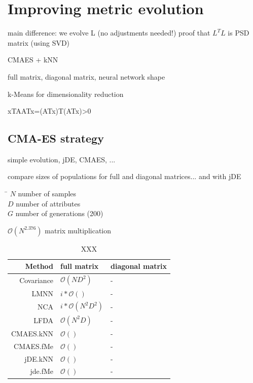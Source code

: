 \documentclass[12pt,a4paper]{report}
\begin{document}



\chapter{Improving metric evolution} \label{chap:our-method}

main difference: we evolve L (no adjustments needed!)
proof that $L^TL$ is PSD matrix  (using SVD)

CMAES + kNN

full matrix, diagonal matrix, neural network shape

k-Means for dimensionality reduction

xTAATx=(ATx)T(ATx)>0

\section{CMA-ES strategy} \label{alg:cmaes}

simple evolution, jDE, CMAES, ...

compare sizes of populations for full and diagonal matrices... and with jDE

\begin{tabbing}
\hspace{50pt}\=\kill
$N$ \> number of samples \\
$D$ \> number of attributes \\ 
$G$ \> number of generations (200) \\
\end{tabbing} 

$\mathcal{O}(N^{2.376})$ matrix multiplication 

\begin{table}[ht] \centering
\begin{tabular}{rll}
\hline
Method & full matrix & diagonal matrix \\
\hline
Covariance & $\mathcal{O}(ND^2)$ & - \\
LMNN & $i*\mathcal{O}()$ & - \\
NCA & $i*\mathcal{O}(N^2D^2)$ & - \\
LFDA & $\mathcal{O}(N^2D)$ & - \\
CMAES.kNN & $\mathcal{O}()$ & - \\
CMAES.fMe & $\mathcal{O}()$ & - \\
jDE.kNN & $\mathcal{O}()$ & - \\
jde.fMe & $\mathcal{O}()$ & - \\ 
\hline
\end{tabular}
\caption{XXX} \label{tab:XXX}
\end{table}
\end{document}
